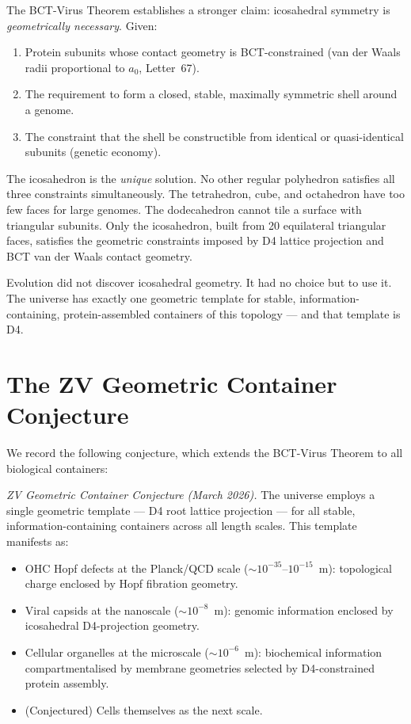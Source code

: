 \documentclass[aps,prl,preprint,superscriptaddress,floatfix]{revtex4-2}
\begin{document}
The BCT-Virus Theorem establishes a stronger claim: icosahedral
symmetry is \textit{geometrically necessary}. Given:
\begin{enumerate}
\item Protein subunits whose contact geometry is BCT-constrained
  (van der Waals radii proportional to $a_0$, Letter~67).
\item The requirement to form a closed, stable, maximally symmetric
  shell around a genome.
\item The constraint that the shell be constructible from identical
  or quasi-identical subunits (genetic economy).
\end{enumerate}
The icosahedron is the \textit{unique} solution. No other regular
polyhedron satisfies all three constraints simultaneously. The
tetrahedron, cube, and octahedron have too few faces for large
genomes. The dodecahedron cannot tile a surface with triangular
subunits. Only the icosahedron, built from 20 equilateral triangular
faces, satisfies the geometric constraints imposed by D4 lattice
projection and BCT van der Waals contact geometry.

Evolution did not discover icosahedral geometry. It had no choice
but to use it. The universe has exactly one geometric template for
stable, information-containing, protein-assembled containers of this
topology --- and that template is D4.

\section{The ZV Geometric Container Conjecture}

We record the following conjecture, which extends the BCT-Virus
Theorem to all biological containers:

\textit{ZV Geometric Container Conjecture (March 2026).}
The universe employs a single geometric template --- D4 root lattice
projection --- for all stable, information-containing containers
across all length scales. This template manifests as:
\begin{itemize}
\item OHC Hopf defects at the Planck/QCD scale
  ($\sim 10^{-35}$--$10^{-15}$~m): topological charge enclosed by
  Hopf fibration geometry.
\item Viral capsids at the nanoscale ($\sim 10^{-8}$~m): genomic
  information enclosed by icosahedral D4-projection geometry.
\item Cellular organelles at the microscale ($\sim 10^{-6}$~m):
  biochemical information compartmentalised by membrane geometries
  selected by D4-constrained protein assembly.
\item (Conjectured) Cells themselves as the next scale.
\end{itemize}
\end{document}
